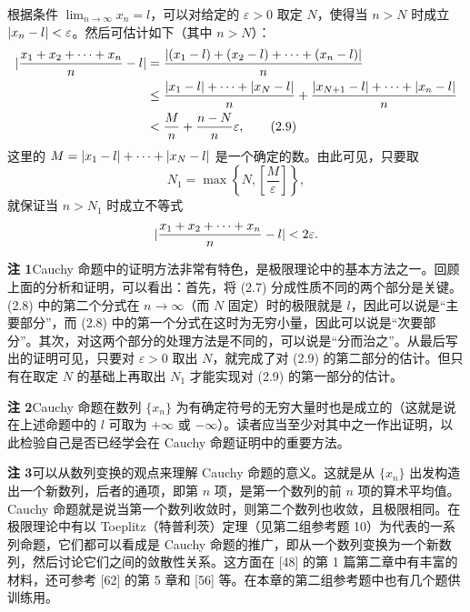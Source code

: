 \begin{xproof}
根据条件 $\displaystyle\lim_{n\to\infty}x_n=l$，可以对给定的 $\varepsilon>0$ 取定 $N$，使得当 $n>N$ 时成立 $\lvert x_n-l\rvert<\varepsilon$。然后可估计如下（其中 $n>N$）：
\begin{align}
  \lvert\frac{x_1+x_2+\cdots+x_n}{n}-l\rvert
  &=\frac{\lvert(x_1-l)+(x_2-l)+\cdots+(x_n-l)\rvert}{n}\\
  &\le\frac{\lvert x_1-l\rvert+\cdots+\lvert x_N-l\rvert}{n}
    +\frac{\lvert x_{N+1}-l\rvert+\cdots+\lvert x_n-l\rvert}{n}\\
  &<\frac Mn+\frac{n-N}{n}\varepsilon,
  \tag{2.9}
  \label{eq:2.9}
\end{align}
这里的 $M=\lvert x_1-l\rvert+\cdots+\lvert x_N-l\rvert$ 是一个确定的数。由此可见，只要取
\[
  N_1=\max\left\{N,\left[\frac M\varepsilon\right]\right\},
\]
就保证当 $n>N_1$ 时成立不等式
\[
  \lvert\frac{x_1+x_2+\cdots+x_n}{n}-l\rvert<2\varepsilon.
\]
\end{xproof}

\begin{xremark}
\textbf{注 1}\quad Cauchy 命题中的证明方法非常有特色，是极限理论中的基本方法之一。回顾上面的分析和证明，可以看出：首先，将 (2.7) 分成性质不同的两个部分是关键。(2.8) 中的第二个分式在 $n\to\infty$（而 $N$ 固定）时的极限就是 $l$，因此可以说是“主要部分”，而 (2.8) 中的第一个分式在这时为无穷小量，因此可以说是“次要部分”。其次，对这两个部分的处理方法是不同的，可以说是“分而治之”。从最后写出的证明可见，只要对 $\varepsilon>0$ 取出 $N$，就完成了对 (2.9) 的第二部分的估计。但只有在取定 $N$ 的基础上再取出 $N_1$ 才能实现对 (2.9) 的第一部分的估计。

\textbf{注 2}\quad Cauchy 命题在数列 $\{x_n\}$ 为有确定符号的无穷大量时也是成立的（这就是说在上述命题中的 $l$ 可取为 $+\infty$ 或 $-\infty$）。读者应当至少对其中之一作出证明，以此检验自己是否已经学会在 Cauchy 命题证明中的重要方法。

\textbf{注 3}\quad 可以从数列变换的观点来理解 Cauchy 命题的意义。这就是从 $\{x_n\}$ 出发构造出一个新数列，后者的通项，即第 $n$ 项，是第一个数列的前 $n$ 项的算术平均值。Cauchy 命题就是说当第一个数列收敛时，则第二个数列也收敛，且极限相同。在极限理论中有以 Toeplitz（特普利茨）定理（见第二组参考题 10）为代表的一系列命题，它们都可以看成是 Cauchy 命题的推广，即从一个数列变换为一个新数列，然后讨论它们之间的敛散性关系。这方面在 [48] 的第 1 篇第二章中有丰富的材料，还可参考 [62] 的第 5 章和 [56] 等。在本章的第二组参考题中也有几个题供训练用。
\end{xremark}

